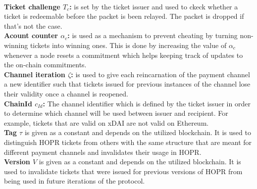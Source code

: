     \\\textbf{Ticket challenge $T_c$:}  is set by the ticket issuer and used to ckeck whether a ticket is redeemable before the packet is been relayed. The packet is dropped if that's not the case.
    \\\textbf{Acount counter $\alpha_c$:} is used as a mechanism to prevent cheating by turning non-winning tickets into winning ones. This is done by increasing the value of $\alpha_c$ whenever a node resets a commitment which helps keeping track of updates to the on-chain commitments.
    \\\textbf{Channel iteration $\zeta$:} is used to give each reincarnation of the payment channel a new identifier such that tickets issued for previous instances of the channel lose their validity once a channel is reopened.
    \\\textbf{ChainId $c_{Id}$:} The channel identifier which is defined by the ticket issuer in order to determine which channel will be used between issuer and recipient. For example, tickets that are valid on xDAI are not valid on Ethereum.
    \\\textbf{Tag $\tau$} is given as a constant and depends on the utilized blockchain. It is used to distinguish HOPR tickets from others with the same structure that are meant for different payment channels and invalidates their usage in HOPR.
    \\\textbf{Version $V$} is given as a constant and depends on the utilized blockchain. It is used to invalidate tickets that were issued for previous versions of HOPR from being used in future iterations of the protocol.



